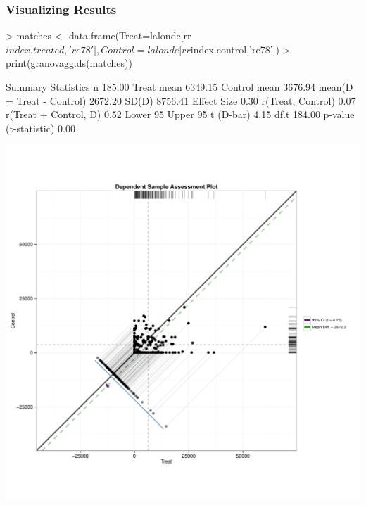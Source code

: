 \documentclass[10pt,slidestop,mathserif,c]{beamer}
\begin{document}
\begin{frame}
    \frametitle{Visualizing Results}
\begin{Schunk}
\begin{Sinput}
> matches <- data.frame(Treat=lalonde[rr$index.treated,'re78'], 
   Control=lalonde[rr$index.control,'re78'])
> print(granovagg.ds(matches))
\end{Sinput}
\begin{Soutput}
                              Summary Statistics
n                                         185.00
Treat mean                               6349.15
Control mean                             3676.94
mean(D = Treat - Control)                2672.20
SD(D)                                    8756.41
Effect Size                                 0.30
r(Treat, Control)                           0.07
r(Treat + Control, D)                       0.52
Lower 95%
Upper 95%
t (D-bar)                                   4.15
df.t                                      184.00
p-value (t-statistic)                       0.00
\end{Soutput}
\end{Schunk}
\end{frame}

\begin{frame}
    \begin{center}
        \includegraphics{figures/Slides-granovaggds}
    \end{center}
\end{frame}
\end{document}
